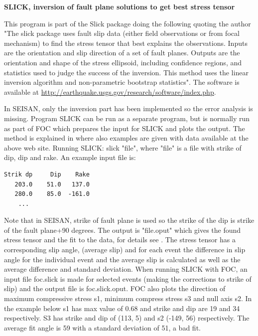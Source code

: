 \textbf{SLICK, inversion of fault plane solutions to get best stress tensor}

This program is part of the Slick package doing the following quoting the author \cite{michael1984} "The slick package uses fault slip data (either field observations or from focal mechanism) to find the stress tensor that best explains the observations. Inputs are the orientation and slip direction of a set of fault planes. Outputs are the orientation and shape of the stress ellipsoid, including confidence regions, and statistics used to judge the success of the inversion. This method uses the linear inversion algorithm and non-parametric bootstrap statistics". The software is available at 
\url{http://earthquake.usgs.gov/research/software/index.php}. 

In SEISAN, only the inversion part has been implemented so the error analysis is missing. Program SLICK can be run as a separate program, but is normally run as part of FOC which prepares the input for SLICK and plots the output.  The method is explained in \cite{michael1984} where also examples are given with data available at the above web site.
Running SLICK: slick "file", where "file" is a file with strike of dip, dip and rake. An example input file is:

\begin{verbatim}
Strik dp     Dip    Rake
   203.0    51.0   137.0
   280.0    85.0  -161.0
    ...
\end{verbatim}

Note that in SEISAN, strike of fault plane is used so the strike of the dip is strike of the fault plane+90 degrees. The output is "file.oput" which gives the found stress tensor and the fit to the data, for details see \cite{michael1984}. The stress tensor has a corresponding slip angle, (average slip) and for each event the difference in slip angle for the individual event and the average slip is calculated as well as the average difference and standard deviation.  When running SLICK with FOC, an input file foc.slick is made for selected events (making the corrections to strike of slip) and the output file is foc.slick.oput. FOC also plots the direction of maximum compressive stress s1, minimum compress stress s3 and null axis s2. In the example below s1 has max value of 0.68 and strike and dip are 19 and 34 respectively. S3 has strike and dip of (113, 5) and s2 (-149, 56) respectively. The average fit angle is 59 with a standard deviation of 51, a bad fit.

